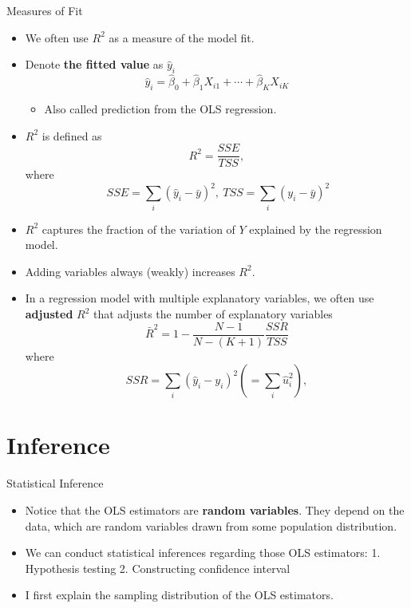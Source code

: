 \documentclass[
  ignorenonframetext,
]{beamer}
\providecommand{\tightlist}{%
  \setlength{\itemsep}{0pt}\setlength{\parskip}{0pt}}
\begin{document}
\begin{frame}{Measures of Fit}
\protect\hypertarget{measures-of-fit}{}

\begin{itemize}
\tightlist
\item
  We often use \(R^2\) as a measure of the model fit.
\item
  Denote \textbf{the fitted value} as \(\hat{y}_i\) \[
   \hat{y}_i = \hat{\beta}_0 + \hat{\beta}_1 X_{i1} + \cdots + \hat{\beta}_K X_{iK}
  \]

  \begin{itemize}
  \tightlist
  \item
    Also called prediction from the OLS regression.
  \end{itemize}
\item
  \(R^2\) is defined as \[
    R^2 = \frac{SSE}{TSS},
    \] where \[ 
     \  SSE = \sum_i (\hat{y}_i - \bar{y})^2, \ TSS = \sum_i (y_i - \bar{y})^2
    \]
\item
  \(R^2\) captures the fraction of the variation of \(Y\) explained by
  the regression model.
\item
  Adding variables always (weakly) increases \(R^2\).
\end{itemize}

\end{frame}

\begin{frame}

\begin{itemize}
\tightlist
\item
  In a regression model with multiple explanatory variables, we often
  use \textbf{adjusted} \(R^2\) that adjusts the number of explanatory
  variables \[
    \bar{R}^2 = 1 - \frac{N-1}{N-(K+1)} \frac{SSR}{TSS}
  \] where \[
    SSR = \sum_i (\hat{y}_i - y_i)^2 (= \sum_i \hat{u}_i^2 ),
    \]
\end{itemize}

\end{frame}

\hypertarget{inference}{%
\section{Inference}\label{inference}}

\begin{frame}{Statistical Inference}
\protect\hypertarget{statistical-inference}{}

\begin{itemize}
\tightlist
\item
  Notice that the OLS estimators are \textbf{random variables}. They
  depend on the data, which are random variables drawn from some
  population distribution.
\item
  We can conduct statistical inferences regarding those OLS estimators:
  1. Hypothesis testing 2. Constructing confidence interval
\item
  I first explain the sampling distribution of the OLS estimators.
\end{itemize}

\end{frame}
\end{document}
